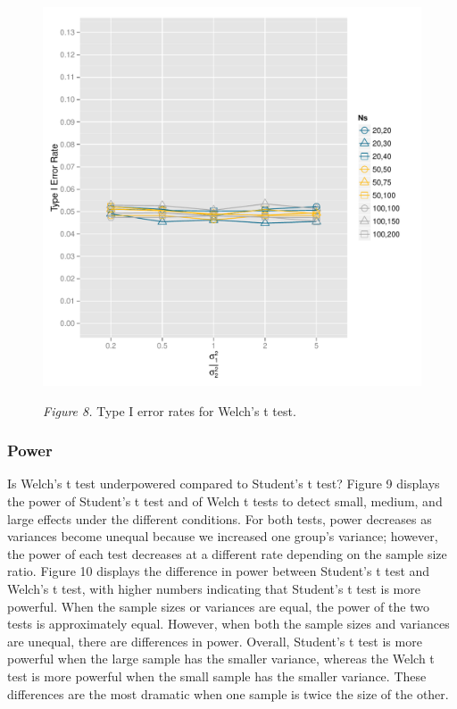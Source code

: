 \documentclass[man,a4paper,noextraspace,apacite]{apa6}\usepackage[]{graphicx}\usepackage[]{color}
\makeatletter
\def\maxwidth{ %
  \ifdim\Gin@nat@width>\linewidth
    \linewidth
  \else
    \Gin@nat@width
  \fi
}
\newenvironment{knitrout}{}{} %
\makeatother
\begin{document}
\begin{figure}
\begin{knitrout}
\color{fgcolor}
\includegraphics[width=\maxwidth]{figure/type1_Welch_plot} 

\end{knitrout}
\textit{Figure 8.} Type I error rates for Welch's t test.
\end{figure}

\subsubsection{Power}






    Is Welch's t test underpowered compared to Student's t test? Figure 9 displays the power of Student's t test and of Welch t tests to detect small, medium, and large effects under the different conditions. For both tests, power decreases as variances become unequal because we increased one group's variance; however, the power of each test decreases at a different rate depending on the sample size ratio. Figure 10 displays the difference in power between Student's t test and Welch's t test, with higher numbers indicating that Student's t test is more powerful. When the sample sizes or variances are equal, the power of the two tests is approximately equal. However, when both the sample sizes and variances are unequal, there are differences in power. Overall, Student's t test is more powerful when the large sample has the smaller variance, whereas the Welch t test is more powerful when the small sample has the smaller variance. These differences are the most dramatic when one sample is twice the size of the other. 
    
\end{document}

